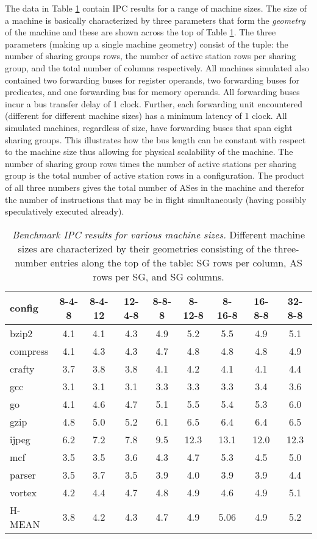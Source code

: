 \documentclass[10pt,dvips]{article}
\begin{document}
%
The data in Table \ref{tab:ipc1} contain IPC 
results for a range of machine sizes.
The size of a machine is basically characterized by
three parameters that form the \textit{geometry} of the machine
and these are shown across the top of Table \ref{tab:ipc1}.
The three parameters (making up a single machine geometry)
consist of the tuple:
the number of sharing groups rows, the number
of active station rows per sharing group, and the total number of 
columns respectively.  
All machines simulated also contained two forwarding buses for
register operands, two forwarding buses for predicates, and
one forwarding bus for memory operands.
All forwarding buses incur a bus transfer delay of 1 clock.
Further, each forwarding unit encountered (different for different
machine sizes) has a minimum latency of 1 clock.
All simulated machines, regardless of size, have forwarding buses
that span eight sharing groups.  
This illustrates how the bus
length can be constant with respect to the machine size thus allowing
for physical scalability of the machine.
The number of sharing group rows times the
number of active stations per sharing group is the total number of
active station rows in a configuration.  The product of all three
numbers gives the total number of ASes in the machine and therefor
the number of instructions that may be in flight 
simultaneously
(having
possibly speculatively executed already).
%
\begin{table}
\begin{center}
\caption{{\em Benchmark IPC results for various machine sizes.}
Different machine sizes are characterized by their
geometries consisting of the three-number entries along the
top of the table: SG rows per column, AS rows per SG, and
SG columns.}
\label{tab:ipc1}
\begin{tabular}{|l|c|c|c|c|c|c|c|c|}
\hline 
config&
8-4-8&8-4-12&12-4-8&8-8-8&8-12-8&8-16-8&16-8-8&32-8-8\\
\hline
\hline 
bzip2&4.1&4.1&4.3&4.9&5.2&5.5&4.9&5.1\\
\hline 
compress&4.1&4.3&4.3&4.7&4.8&4.8&4.8&4.9\\
\hline 
crafty&3.7&3.8&3.8&4.1&4.2&4.1&4.1&4.4\\
\hline 
gcc&3.1&3.1&3.1&3.3&3.3&3.3&3.4&3.6\\
\hline 
go&4.1&4.6&4.7&5.1&5.5&5.4&5.3&6.0\\
\hline 
gzip&4.8&5.0&5.2&6.1&6.5&6.4&6.4&6.5\\
\hline 
ijpeg&6.2&7.2&7.8&9.5&12.3&13.1&12.0&12.3\\
\hline 
mcf&3.5&3.5&3.6&4.3&4.7&5.3&4.5&5.0\\
\hline 
parser&3.5&3.7&3.5&3.9&4.0&3.9&3.9&4.4\\
\hline 
vortex&4.2&4.4&4.7&4.8&4.9&4.6&4.9&5.1\\
\hline 
\hline 
H-MEAN&3.8&4.2&4.3&4.7&4.9&5.06&4.9&5.2\\
\hline
\end{tabular}
\end{center}
\end{table}
\end{document}
